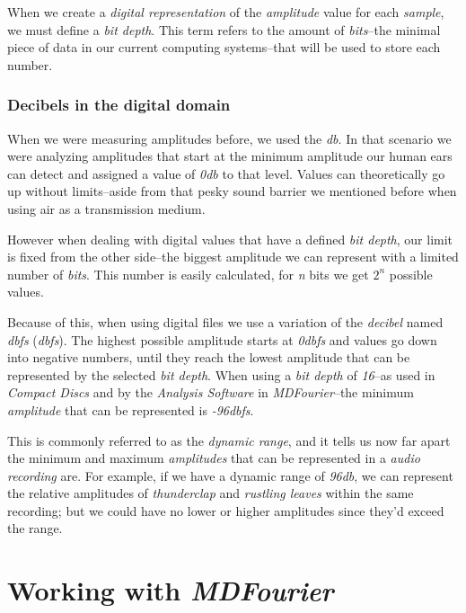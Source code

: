 \documentclass[10pt,a4paper]{report}
\newcommand{\define}[1]{\textit{\acrlong{#1}} (\textit{\acrshort{#1}})}
\newcommand{\ac}[1]{\textit{\acrshort{#1}}}
\newcommand{\db}[1]{\textit{#1\acrshort{dbfs}}}
\begin{document}
When we create a \textit{digital representation} of the \textit{amplitude} value for each \textit{sample}, we must define a \textit{bit depth}. This term refers to the amount of \textit{bits}--the minimal piece of data in our current computing systems--that will be used to store each number.


\subsection{Decibels in the digital domain}

When we were measuring amplitudes before, we used the \ac{db}. In that scenario we were analyzing amplitudes that start at the minimum amplitude our human ears can detect and assigned a value of \textit{0\acrshort{db}} to that level. Values can theoretically go up without limits--aside from that pesky sound barrier we mentioned before when using air as a transmission medium.

However when dealing with digital values that have a defined \textit{bit depth}, our limit is fixed from the other side--the biggest amplitude we can represent with a limited number of \textit{bits}. This number is easily calculated, for \textit{n} bits we get $2^n$ possible values.

Because of this, when using digital files we use a variation of the \textit{decibel} named \define{dbfs}. The highest possible amplitude starts at \db{0} and values go down into negative numbers, until they reach the lowest amplitude that can be represented by the selected \textit{bit depth}. When using a \textit{bit depth} of \textit{16}--as used in \textit{Compact Discs} and by the \textit{Analysis Software} in \textit{MDFourier}--the minimum \textit{amplitude} that can be represented is \db{-96}.

This is commonly referred to as the \textit{dynamic range}, and it tells us now far apart the minimum and maximum \textit{amplitudes} that can be represented in a \textit{audio recording} are. For example, if we have a dynamic range of \textit{96\acrshort{db}}, we can represent the relative amplitudes of \textit{thunderclap} and \textit{rustling leaves} within the same recording; but we could have no lower or higher amplitudes since they'd exceed the range.


\chapter{Working with \textit{MDFourier}}
\label{workflow}
\end{document}
